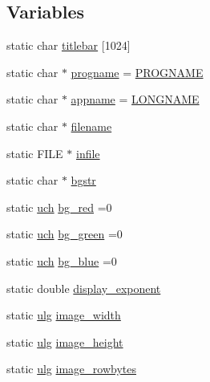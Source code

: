 \subsection*{Variables}
\begin{DoxyCompactItemize}
\item 
static char \mbox{\hyperlink{rpng-win_8c_a7d71fb2a6cfb5d27855f58bc7e548978}{titlebar}} \mbox{[}1024\mbox{]}
\item 
static char $\ast$ \mbox{\hyperlink{rpng-win_8c_ab9e1449fd00c98428516f0b41eddcb10}{progname}} = \mbox{\hyperlink{_visual_png_8c_a8c9afb758de9a0355c93fc926b8ce6b1}{P\+R\+O\+G\+N\+A\+ME}}
\item 
static char $\ast$ \mbox{\hyperlink{rpng-win_8c_a9db0329b02c3e8e0260939a1c680738a}{appname}} = \mbox{\hyperlink{_visual_png_8c_ae8176192ea4d52bb0acbcfeaaffb3bd8}{L\+O\+N\+G\+N\+A\+ME}}
\item 
static char $\ast$ \mbox{\hyperlink{rpng-win_8c_aeac90097f29f7529968697163cea5c18}{filename}}
\item 
static F\+I\+LE $\ast$ \mbox{\hyperlink{rpng-win_8c_af19157da745ecb3f2b088c8f3a10c0a7}{infile}}
\item 
static char $\ast$ \mbox{\hyperlink{rpng-win_8c_af197c1438afe61953ac3b79cdde82caa}{bgstr}}
\item 
static \mbox{\hyperlink{readpng_8h_af3307af5922c72924a837559c801a8a4}{uch}} \mbox{\hyperlink{rpng-win_8c_a11a1f227fa7e010da3dd91c95288d25c}{bg\+\_\+red}} =0
\item 
static \mbox{\hyperlink{readpng_8h_af3307af5922c72924a837559c801a8a4}{uch}} \mbox{\hyperlink{rpng-win_8c_acb75e759bae104f88e4d759ff420f01a}{bg\+\_\+green}} =0
\item 
static \mbox{\hyperlink{readpng_8h_af3307af5922c72924a837559c801a8a4}{uch}} \mbox{\hyperlink{rpng-win_8c_a72e59a2a673bbf5e1b2a442e846cb30f}{bg\+\_\+blue}} =0
\item 
static double \mbox{\hyperlink{rpng-win_8c_ad738f63cfb0d9f52281786250bd91ceb}{display\+\_\+exponent}}
\item 
static \mbox{\hyperlink{readpng_8h_abd6f60bf9450af2ecb94097a32c19a64}{ulg}} \mbox{\hyperlink{rpng-win_8c_a3b6cf9cbad0cab3d7487c4b95eccf670}{image\+\_\+width}}
\item 
static \mbox{\hyperlink{readpng_8h_abd6f60bf9450af2ecb94097a32c19a64}{ulg}} \mbox{\hyperlink{rpng-win_8c_a1bd99dc918f6e33880e71043b4ba3c38}{image\+\_\+height}}
\item 
static \mbox{\hyperlink{readpng_8h_abd6f60bf9450af2ecb94097a32c19a64}{ulg}} \mbox{\hyperlink{rpng-win_8c_a140cae2e235228abcc51d57a6d6484d3}{image\+\_\+rowbytes}}

\end{DoxyCompactItemize}
